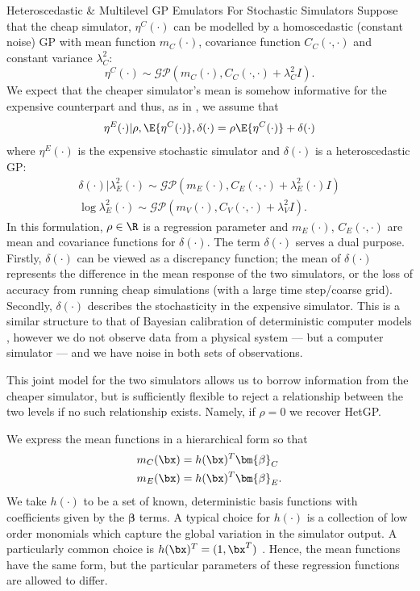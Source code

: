 \begin{chapter}{Heteroscedastic \& Multilevel GP Emulators For Stochastic Simulators\label{Ch:Hetsml}}
Suppose that the cheap simulator, $\eta^C(\cdot)$ can be modelled by a homoscedastic (constant noise) GP with mean function $m_C(\cdot)$, covariance function $C_C(\cdot, \cdot)$ and constant variance $\lambda^2_C$:
\begin{equation}
	\eta^C(\cdot) \sim \mathcal{GP} \left( m_C(\cdot), C_C(\cdot, \cdot) + \lambda^2_C  I\right).\nonumber
\end{equation}
We expect that the cheaper simulator's mean is somehow informative for the expensive counterpart and thus, as in \cite{Kennedy2000}, we assume that
\begin{equation}
	\eta^E(\cdot)|\rho, \E\{\eta^C(\cdot)\}, \delta(\cdot) = \rho \E\{ \eta^C(\cdot) \} + \delta(\cdot)\nonumber
\end{equation}
where $\eta^E (\cdot)$ is the expensive stochastic simulator and $\delta(\cdot)$ is a heteroscedastic GP:
\begin{align}
	\delta(\cdot)|\lambda_E^2 (\cdot) \sim \mathcal{GP}\left( m_E(\cdot), C_E(\cdot, \cdot) + \lambda^2_E(\cdot)I \right) \nonumber\\
\log \lambda^2_E(\cdot) \sim \mathcal{GP} \left( m_V(\cdot), C_V (\cdot, \cdot) + \lambda_{V}^2 I \right).\nonumber
\end{align}
In this formulation, $\rho \in \R$ is a regression parameter and $m_E(\cdot)$, $C_E(\cdot, \cdot)$ are mean and covariance functions for $\delta(\cdot)$. The term $\delta(\cdot)$ serves a dual purpose. Firstly, $\delta(\cdot)$ can be viewed as a discrepancy function; the mean of $\delta(\cdot)$ represents the difference in the mean response of the two simulators, or the loss of accuracy from running cheap simulations (with a large time step/coarse grid). Secondly, $\delta(\cdot)$ describes the stochasticity in the expensive simulator. This is a similar structure to that of Bayesian calibration of deterministic computer models \citep{Ohagan01}, however we do not observe data from a physical system --- but a computer simulator --- and we have noise in both sets of observations.

This joint model for the two simulators allows us to borrow information from the cheaper simulator, but is sufficiently flexible to reject a relationship between the two levels if no such relationship exists. Namely, if $\rho = 0$ we recover HetGP.

We express the mean functions in a hierarchical form so that
\begin{align}
	m_C(\bx) &= h(\bx)^T \bm{\beta}_C \nonumber\\
	m_E(\bx) &= h(\bx)^T \bm{\beta}_E.\nonumber
\end{align}
We take $h(\cdot)$ to be a set of known, deterministic basis functions with coefficients given by the $\bm{\beta}$ terms. A typical choice for $h(\cdot)$ is a collection of low order monomials which capture the global variation in the simulator output. A particularly common choice is $h(\bx)^T = (1, \bx^T)$ \citep{Fricker2011, Becker2012}. Hence, the mean functions have the same form, but the particular parameters of these regression functions are allowed to differ.


\end{chapter}
